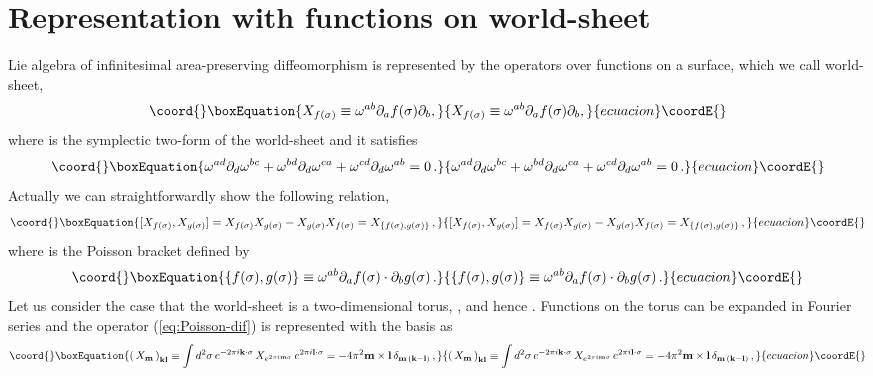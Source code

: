 \documentclass[a4paper,12pt]{article}
\begin{document}
\section{Representation with functions on world-sheet}
Lie algebra of infinitesimal area-preserving diffeomorphism is
represented by the operators over functions on a surface, which we
call world-sheet,
\begin{equation}\coord{}\boxEquation{
 X_{f(\sigma)}\equiv\omega^{ab}\partial_af(\sigma)\partial_b,
	\label{eq:Poisson-dif}
}{
 X_{f(\sigma)}\equiv\omega^{ab}\partial_af(\sigma)\partial_b,
	}{ecuacion}\coordE{}\end{equation}
where \myHighlight{$\omega$}\coordHE{} is the symplectic two-form of the world-sheet
and it satisfies
\begin{equation}\coord{}\boxEquation{
  \omega^{ad}\partial_d\omega^{bc} +
  \omega^{bd}\partial_d\omega^{ca} +
  \omega^{cd}\partial_d\omega^{ab} =0\,.
}{
  \omega^{ad}\partial_d\omega^{bc} +
  \omega^{bd}\partial_d\omega^{ca} +
  \omega^{cd}\partial_d\omega^{ab} =0\,.
}{ecuacion}\coordE{}\end{equation}
Actually we can straightforwardly show the following relation,
\begin{equation}\coord{}\boxEquation{
 [X_{f(\sigma)},X_{g(\sigma)}]
  =X_{f(\sigma)}X_{g(\sigma)}-X_{g(\sigma)}X_{f(\sigma)}
  =X_{\{f(\sigma),g(\sigma)\}}\,, \label{eq:ComX}
}{
 [X_{f(\sigma)},X_{g(\sigma)}]
  =X_{f(\sigma)}X_{g(\sigma)}-X_{g(\sigma)}X_{f(\sigma)}
  =X_{\{f(\sigma),g(\sigma)\}}\,, }{ecuacion}\coordE{}\end{equation}
where \coordHE{} is the Poisson bracket defined by
\begin{equation}\coord{}\boxEquation{
 \{f(\sigma),g(\sigma)\} \equiv
	\omega^{ab}\partial_a f(\sigma) \cdot \partial_b g(\sigma)\,.
}{
 \{f(\sigma),g(\sigma)\} \equiv
	\omega^{ab}\partial_a f(\sigma) \cdot \partial_b g(\sigma)\,.
}{ecuacion}\coordE{}\end{equation}
Let us consider the case that the world-sheet is a two-dimensional
torus, \myHighlight{$\sigma\in [\,0,1)\times [\,0,1)$}\coordHE{}, and hence
\coordHE{}.
Functions on the torus can be expanded in Fourier series and the
operator (\ref{eq:Poisson-dif}) is represented with the basis as
\begin{equation}\coord{}\boxEquation{
  \left(\,X_{\bf m}\,\right)_{\bf kl} \equiv \int d^2\sigma\,
   e^{-2\pi i {\bf k}\cdot \sigma}\, X_{e^{2\pi i {\bf m}\sigma}}\,
   e^{2\pi i {\bf l}\cdot\sigma}= -4\pi^2 {\bf m}\times{\bf l}\,
   \delta_{{\bf m}\,({\bf k-l})}\,,\label{eq:Padj}
}{
  \left(\,X_{\bf m}\,\right)_{\bf kl} \equiv \int d^2\sigma\,
   e^{-2\pi i {\bf k}\cdot \sigma}\, X_{e^{2\pi i {\bf m}\sigma}}\,
   e^{2\pi i {\bf l}\cdot\sigma}= -4\pi^2 {\bf m}\times{\bf l}\,
   \delta_{{\bf m}\,({\bf k-l})}\,,}{ecuacion}\coordE{}\end{equation}
\end{document}
